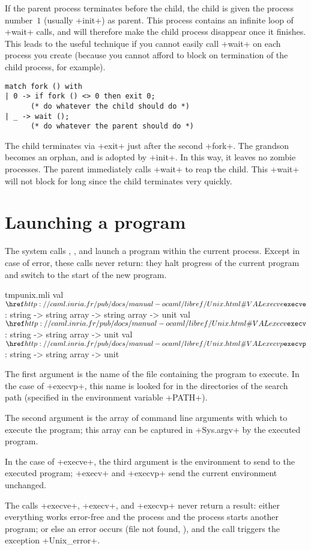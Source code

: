 If the parent process terminates before the child, the child is
given the process number~$1$ (usually \ml+init+) as parent. This
process contains an infinite loop of \ml+wait+ calls, and will
therefore make the child process disappear once it finishes. This
leads to the useful  technique if you cannot
easily call \ml+wait+ on each process you create (because you cannot
afford to block on termination of the child process,
for example).
%
\begin{lstlisting}
match fork () with
| 0 -> if fork () <> 0 then exit 0;
      (* do whatever the child should do *)
| _ -> wait ();
      (* do whatever the parent should do *)
\end{lstlisting}
%
The child terminates via \ml+exit+ just after the second \ml+fork+.
The grandson becomes an orphan, and is adopted by \ml+init+.  In this
way, it leaves no zombie processes. The parent immediately calls
\ml+wait+ to reap the child. This \ml+wait+ will not block for long
since the child terminates very quickly.

\section{Launching a program}

The system calls , , and
 launch a program within the current process.
Except in case of error, these calls never return: they halt progress
of the current program and switch to the start of the new program.
%
\begin{listingcodefile}{tmpunix.mli}
val $\libvalue{Unix}{execve}$ : string -> string array -> string array -> unit
val $\libvalue{Unix}{execv}$  : string -> string array -> unit
val $\libvalue{Unix}{execvp}$ : string -> string array -> unit
\end{listingcodefile}
%
The first argument is the name of the file containing the program to
execute. In the case of \ml+execvp+, this name is looked for in the
directories of the search path (specified in the environment variable
\ml+PATH+).

The second argument is the array of command line arguments with which
to execute the program; this array can be captured in \ml+Sys.argv+ by
the executed program.

In the case of \ml+execve+, the third argument is the environment
to send to the executed program; \ml+execv+ and \ml+execvp+
send the current environment unchanged.

The calls \ml+execve+, \ml+execv+, and \ml+execvp+ never return a
result: either everything works error-free and the process and the
process starts another program; or else an error occurs (file not
found, \etc), and the call triggers the exception \ml+Unix_error+.


